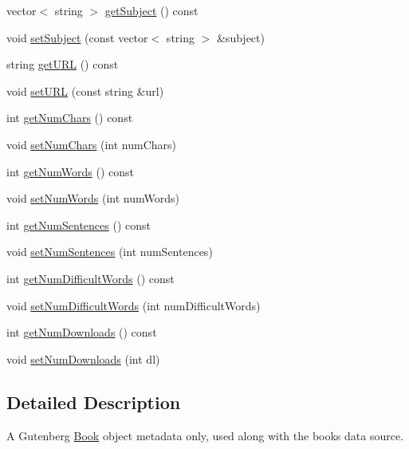 \begin{DoxyCompactItemize}
\item 
vector$<$ string $>$ \hyperlink{classbridges_1_1_gutenberg_book_a9e5254871165856f457dc5a77a4793b3}{get\+Subject} () const 
\item 
void \hyperlink{classbridges_1_1_gutenberg_book_a705486531e78750c1b8fb6c5bba59f8c}{set\+Subject} (const vector$<$ string $>$ \&subject)
\item 
string \hyperlink{classbridges_1_1_gutenberg_book_ae9304e023bb07a121d314685dabdfdbb}{get\+U\+R\+L} () const 
\item 
void \hyperlink{classbridges_1_1_gutenberg_book_aa60ee0598e6726611f1b4fe6cdb53748}{set\+U\+R\+L} (const string \&url)
\item 
int \hyperlink{classbridges_1_1_gutenberg_book_a07e6ecfb667041bf7f99275a6cd8b45c}{get\+Num\+Chars} () const 
\item 
void \hyperlink{classbridges_1_1_gutenberg_book_a65cb7af6360e56a684e0606593846780}{set\+Num\+Chars} (int num\+Chars)
\item 
int \hyperlink{classbridges_1_1_gutenberg_book_aa3dd7b5eb28582d143e591a3dd236813}{get\+Num\+Words} () const 
\item 
void \hyperlink{classbridges_1_1_gutenberg_book_a34dafee1fb976f1da102d40f33a08ecf}{set\+Num\+Words} (int num\+Words)
\item 
int \hyperlink{classbridges_1_1_gutenberg_book_a0d727e984e4f62e9aa3ca5fd929d60c3}{get\+Num\+Sentences} () const 
\item 
void \hyperlink{classbridges_1_1_gutenberg_book_a368e71eaea48375104f172e0ae17527d}{set\+Num\+Sentences} (int num\+Sentences)
\item 
int \hyperlink{classbridges_1_1_gutenberg_book_a0a6c919d374203d7b4a07c94fedf0979}{get\+Num\+Difficult\+Words} () const 
\item 
void \hyperlink{classbridges_1_1_gutenberg_book_a4397cd3b9fd6113a1e72eb7671dd9d87}{set\+Num\+Difficult\+Words} (int num\+Difficult\+Words)
\item 
int \hyperlink{classbridges_1_1_gutenberg_book_a10fb0a20fb3731474d4d88639b853d9a}{get\+Num\+Downloads} () const 
\item 
void \hyperlink{classbridges_1_1_gutenberg_book_a6846dba9a5a78f360a0483b8685d79c1}{set\+Num\+Downloads} (int dl)
\end{DoxyCompactItemize}


\subsection{Detailed Description}
A Gutenberg \hyperlink{classbridges_1_1_book}{Book} object metadata only, used along with the books data source. 

